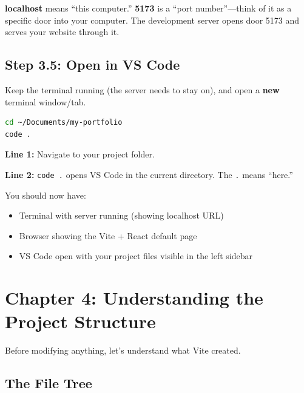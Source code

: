 \documentclass[12pt,a4paper]{article}
\begin{document}
\begin{concept}
\textbf{localhost} means ``this computer.'' \textbf{5173} is a ``port number''---think of it as a specific door into your computer. The development server opens door 5173 and serves your website through it.
\end{concept}

\subsection{Step 3.5: Open in VS Code}

Keep the terminal running (the server needs to stay on), and open a \textbf{new} terminal window/tab.

\begin{lstlisting}[language=bash,caption={Open project in VS Code}]
cd ~/Documents/my-portfolio
code .
\end{lstlisting}

\begin{explanation}
\textbf{Line 1:} Navigate to your project folder.

\textbf{Line 2:} \texttt{code .} opens VS Code in the current directory. The \texttt{.} means ``here.''
\end{explanation}

\begin{checkpoint}
You should now have:
\begin{itemize}
    \item[$\square$] Terminal with server running (showing localhost URL)
    \item[$\square$] Browser showing the Vite + React default page
    \item[$\square$] VS Code open with your project files visible in the left sidebar
\end{itemize}
\end{checkpoint}

\section{Chapter 4: Understanding the Project Structure}

Before modifying anything, let's understand what Vite created.

\subsection{The File Tree}
\end{document}
